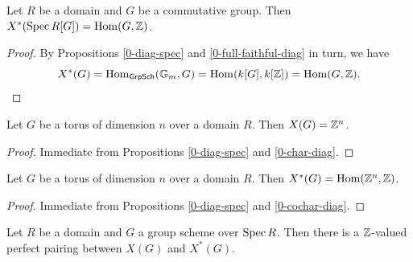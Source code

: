 \begin{proposition}
  \label{0-cochar-diag}
  \leanok

  Let $R$ be a domain and $G$ be a commutative group.
  Then $X^*(\operatorname{Spec} R[G]) = \operatorname{Hom}(G, {\mathbb Z})$.
\end{proposition}
\begin{proof}
  \leanok

  By Propositions \ref{0-diag-spec} and \ref{0-full-faithful-diag} in turn, we have
  \[
    X^*(G) = \operatorname{Hom}_{\mathsf{GrpSch}}({\mathbb G}_m, G) = \operatorname{Hom}(k[G], k[{\mathbb Z}]) = \operatorname{Hom}(G, {\mathbb Z}).
  \]
\end{proof}


\begin{proposition}
  \label{0-char-torus}
  \leanok

  Let $G$ be a torus of dimension $n$ over a domain $R$.
  Then $X(G) = {\mathbb Z}^n$.
\end{proposition}
\begin{proof}
  \leanok

  Immediate from Propositions \ref{0-diag-spec} and \ref{0-char-diag}.
\end{proof}


\begin{proposition}
  \label{0-cochar-torus}
  \leanok

  Let $G$ be a torus of dimension $n$ over a domain $R$.
  Then $X^*(G) = \operatorname{Hom}({\mathbb Z}^n, {\mathbb Z})$.
\end{proposition}
\begin{proof}
  \leanok

  Immediate from Propositions \ref{0-diag-spec} and \ref{0-cochar-diag}.
\end{proof}


\begin{definition}
  \label{0-char-cochar-pairing}
  \leanok

  Let $R$ be a domain and $G$ a group scheme over $\operatorname{Spec} R$.
  Then there is a ${\mathbb Z}$-valued perfect pairing between $X(G)$ and $X^*(G)$.
\end{definition}


